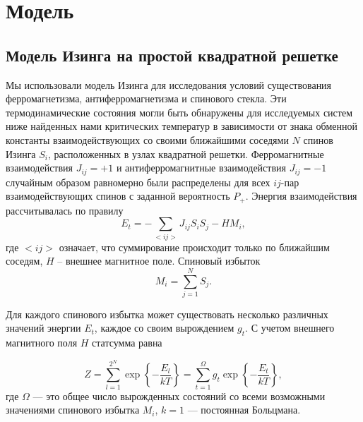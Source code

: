 \chapter{Модель}\label{ch:ch1}

\section{Модель Изинга на простой квадратной решетке}
Мы использовали модель Изинга для исследования условий существования ферромагнетизма, антиферромагнетизма и спинового стекла. Эти термодинамические состояния могли быть обнаружены для исследуемых систем ниже найденных нами критических температур в зависимости от знака обменной константы взаимодействующих со своими ближайшими соседями $N$ спинов Изинга $S_i$, расположенных в узлах квадратной решетки. Ферромагнитные взаимодействия $J_{ij}=+1$ и антиферромагнитные взаимодействия $J_{ij}=-1$ случайным образом равномерно были распределены для всех $ij$-пар взаимодействующих спинов с заданной вероятность $P_+$. Энергия взаимодействия рассчитывалась по правилу
\begin{equation}
	E_t = -\sum_{<ij>}J_{ij} S_iS_j-HM_i,
	\label{eq:internal_energy}
\end{equation}
где $<ij>$ означает, что суммирование происходит только по ближайшим соседям, $H$ -- внешнее магнитное поле.  Спиновый избыток
\begin{equation}
	M_i = \sum_{j=1}^NS_j.
	\label{eq:spinex}
\end{equation}

Для каждого спинового избытка может существовать несколько различных значений энергии $E_t$, каждое со своим вырождением $g_t$. С учетом внешнего магнитного поля $H$ статсумма равна

\begin{equation}  
	Z=\sum_{l=1}^{2^N}\exp\left\{-\frac{E_l}{kT}\right\}=\sum_{t=1}^{\Omega}g_t \exp\left\{-\frac{E_t}{kT}\right\},
	\label{eq:partfunk}
\end{equation}
где $\Omega$ --- это общее число вырожденных состояний со всеми возможными значениями спинового избытка $M_i$, $k=1$ --- постоянная Больцмана. 